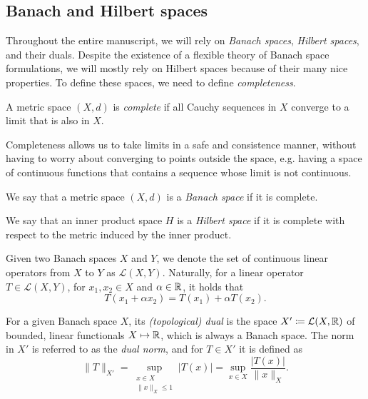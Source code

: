 \subsection{Banach and Hilbert spaces}\label{sec:banach-hilbert-spaces}
Throughout the entire manuscript, we will rely on \emph{Banach spaces}, \emph{Hilbert spaces}, and their duals. Despite the existence of a flexible theory of Banach space formulations, we will mostly rely on Hilbert spaces because of their many nice properties. To define these spaces, we need to define \emph{completeness}.
\begin{definition}[Completeness]
    A metric space $(X,d)$ is \emph{complete} if all Cauchy sequences in $X$ converge to a limit that is also in $X$.
\end{definition}
Completeness allows us to take limits in a safe and consistence manner, without having to worry about converging to points outside the space, e.g. having a space of continuous functions that contains a sequence whose limit is not continuous. 
\begin{definition}\label{def:banach-space}
    We say that a metric space $(X,d)$ is a \emph{Banach space} if it is complete.
\end{definition}
\begin{definition}\label{def:hilbert-space}
    We say that an inner product space $H$ is a \emph{Hilbert space} if it is complete with respect to the metric induced by the inner product.
\end{definition}
\begin{definition}\label{def:linear-operator}
    Given two Banach spaces $X$ and $Y$, we denote the set of continuous linear operators from $X$ to $Y$ as $\mathcal{L}(X,Y)$. Naturally, for a linear operator $T\in \mathcal{L}(X,Y)$, for $x_1,x_2\in X$ and $\alpha\in\mathbb{R}$, it holds that 
    \begin{equation}
        T(x_1+\alpha x_2) = T(x_1) + \alpha T(x_2).
    \end{equation}
\end{definition}
\begin{definition}
    For a given Banach space $X$, its \emph{(topological) dual} is the space $X'\coloneqq \mathcal{L}(X,\mathbb{R})$ of bounded, linear functionals $X\mapsto \mathbb{R}$, which is always a Banach space. The norm in $X'$ is referred to as the \emph{dual norm}, and for $T\in X'$ it is defined as 
    \begin{equation}\label{eq:dual-norm}
        \|T\|_{X'} = \sup_{\substack{x\in X\\ \|x\|_X\leq 1}} |T(x)|= \sup_{x\in X}\frac{|T(x)|}{\|x\|_X}.
    \end{equation}
\end{definition}
